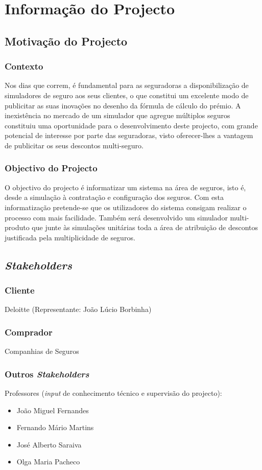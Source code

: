 \chapter{Informação do Projecto}
\section{Motivação do Projecto}
\subsection{Contexto}
Nos dias que correm, é fundamental para as seguradoras a disponibilização de simuladores de seguro aos seus clientes, o que constitui um excelente modo de publicitar as suas inovações no desenho da fórmula de cálculo do prémio.
A inexistência no mercado de um simulador que agregue múltiplos seguros constituiu uma oportunidade para o desenvolvimento deste projecto, com grande potencial de interesse por parte das seguradoras, visto oferecer-lhes a vantagem de publicitar os seus descontos multi-seguro.
\subsection{Objectivo do Projecto}
O objectivo do projecto é informatizar um sistema na área de seguros, isto é, desde a simulação à contratação e configuração dos seguros. Com esta informatização pretende-se que os utilizadores do sistema consigam realizar o processo com mais facilidade. Também será desenvolvido um simulador multi-produto que junte às simulações unitárias toda a área de atribuição de descontos justificada pela multiplicidade de seguros.

\section{\emph{Stakeholders}}

\subsection{Cliente}
Deloitte (Representante: João Lúcio Borbinha)

\subsection{Comprador}
Companhias de Seguros

\subsection{Outros \emph{Stakeholders}}
Professores (\emph{input} de conhecimento técnico e supervisão do projecto):
\begin{itemize}
\item João Miguel Fernandes
\item Fernando Mário Martins
\item José Alberto Saraiva
\item Olga Maria Pacheco
\end{itemize}
